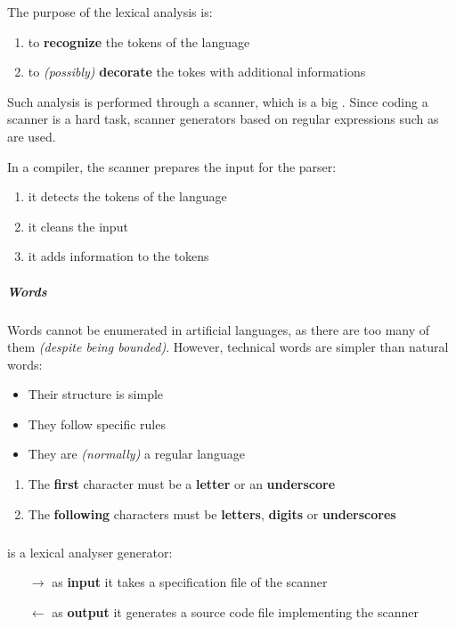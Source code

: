 \documentclass[english]{article}
\begin{document}
The purpose of the lexical analysis is:

\begin{enumerate}
  \item to \textbf{recognize} the tokens of the language
  \item to \textit{(possibly)} \textbf{decorate} the tokes with additional informations
\end{enumerate}

Such analysis is performed through a scanner, which is a big \FSA.
Since coding a scanner is a hard task, scanner generators based on regular expressions such as \flex are used.

In a compiler, the scanner prepares the input for the parser:

\begin{enumerate}
  \item it detects the tokens of the language
  \item it cleans the input
  \item it adds information to the tokens
\end{enumerate}

\subparagraph*{Words}
Words cannot be enumerated in artificial languages, as there are too many of them \textit{(despite being bounded)}.
However, technical words are simpler than natural words:

\begin{itemize}
  \item Their structure is simple
  \item They follow specific rules
  \item They are \textit{(normally)} a regular language
\end{itemize}

\begin{property}
  \label{prop:c-identifiers}
  \hfill
  \begin{enumerate}
    \item The \textbf{first} character must be a \textbf{letter} or an \textbf{underscore}
    \item The \textbf{following} characters must be \textbf{letters}, \textbf{digits} or \textbf{underscores}
  \end{enumerate}
\end{property}

\subparagraph*{\flex}
\flex is a lexical analyser generator:

\begin{itemize}
  \item[\(\rightarrow\)] as \textbf{input} it takes a specification file of the scanner
  \item[\(\leftarrow\)] as \textbf{output} it generates a \clang source code file implementing the scanner
\end{itemize}
\end{document}
